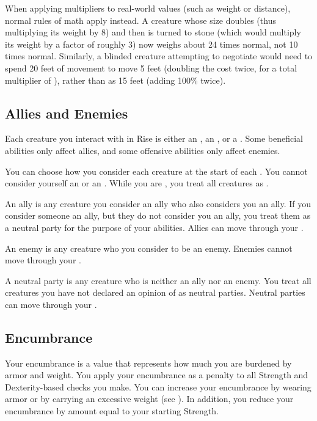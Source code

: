         When applying multipliers to real-world values (such as weight or distance), normal rules of math apply instead.
        A creature whose size doubles (thus multiplying its weight by 8) and then is turned to stone (which would multiply its weight by a factor of roughly 3) now weighs about 24 times normal, not 10 times normal.
        Similarly, a blinded creature attempting to negotiate  would need to spend 20 feet of movement to move 5 feet (doubling the cost twice, for a total multiplier of ), rather than as 15 feet (adding 100\% twice).

    \subsection{Allies and Enemies}\label{Allies and Enemies}
        Each creature you interact with in Rise is either an , an , or a .
        Some beneficial abilities only affect allies, and some offensive abilities only affect enemies.

        You can choose how you consider each creature at the start of each .
        You cannot consider yourself an  or an .
        While you are , you treat all creatures as .

         An ally is any creature you consider an ally who also considers you an ally.
        If you consider someone an ally, but they do not consider you an ally, you treat them as a neutral party for the purpose of your abilities.
        Allies can move through your .

         An enemy is any creature who you consider to be an enemy.
        Enemies cannot move through your .

         A neutral party is any creature who is neither an ally nor an enemy.
        You treat all creatures you have not declared an opinion of as neutral parties.
        Neutral parties can move through your .

    \subsection{Encumbrance}\label{Encumbrance}
        Your encumbrance is a value that represents how much you are burdened by armor and weight.
        You apply your encumbrance as a penalty to all Strength and Dexterity-based checks you make.
        You can increase your encumbrance by wearing armor or by carrying an excessive weight (see ).
        In addition, you reduce your encumbrance by amount equal to your starting Strength.

